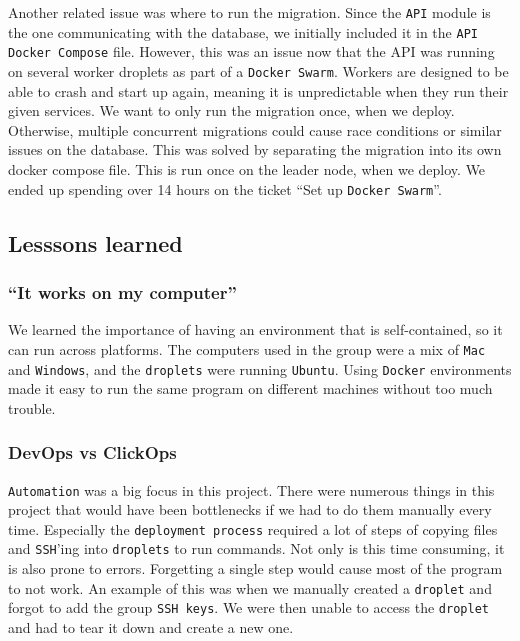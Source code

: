 Another related issue was where to run the migration.
Since the \texttt{API} module is the one communicating with the database,
we initially included it in the \texttt{API Docker Compose} file.
However, this was an issue now that the API was running on several 
worker droplets as part of a \texttt{Docker Swarm}. Workers are designed
to be able to crash and start up again, 
meaning it is unpredictable when they run their given services.
We want to only run the migration once, when we deploy.
Otherwise, multiple concurrent migrations could cause 
race conditions or similar issues on the database.
This was solved by separating the migration into its own docker compose file.
This is run once on the leader node, when we deploy.
We ended up spending over 14 hours on the ticket ``Set up \texttt{Docker Swarm}''.

\subsection{Lesssons learned}

\subsubsection{``It works on my computer''}

We learned the importance of having an environment that is 
self-contained, so it can run across platforms.
The computers used in the group were a mix of \texttt{Mac} and \texttt{Windows},
and the \texttt{droplets} were running \texttt{Ubuntu}. 
Using \texttt{Docker} environments made it easy to run the same program
on different machines without too much trouble.

\subsubsection{DevOps vs ClickOps}

\texttt{Automation} was a big focus in this project.
There were numerous things in this project that 
would have been bottlenecks if we had to do them manually every time.
Especially the \texttt{deployment process} required a lot of steps
of copying files and \texttt{SSH}'ing into \texttt{droplets} to run commands.
Not only is this time consuming, it is also prone to errors.
Forgetting a single step would cause most of the program to not work.
An example of this was when we manually created a \texttt{droplet} and forgot to add the 
group \texttt{SSH keys}. We were then unable to access the \texttt{droplet} and had to 
tear it down and create a new one.


